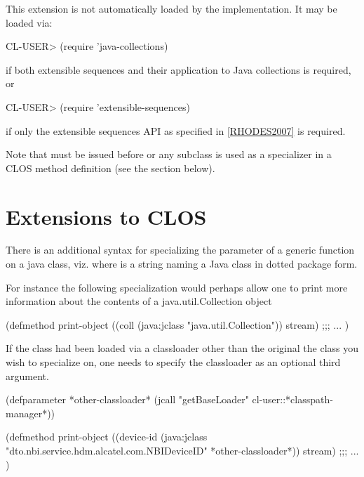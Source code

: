 \documentclass[10pt]{book}
\begin{document}
This extension is not automatically loaded by the implementation.   It
may be loaded via:

\begin{listing-lisp}
CL-USER> (require 'java-collections)
\end{listing-lisp}

if both extensible sequences and their application to Java collections
is required, or

\begin{listing-lisp}
CL-USER> (require 'extensible-sequences)
\end{listing-lisp}

if only the extensible sequences API as specified in \ref{RHODES2007} is
required.

Note that  must be issued before
 or any subclass is used as a specializer in a CLOS
method definition (see the section below).

\section{Extensions to CLOS}

There is an additional syntax for specializing the parameter of a
generic function on a java class, viz. 
where  is a string naming a Java class in dotted package
form.

For instance the following specialization would perhaps allow one to
print more information about the contents of a java.util.Collection
object

\begin{listing-lisp}
(defmethod print-object ((coll (java:jclass "java.util.Collection"))
                         stream)
  ;;; ...
)
\end{listing-lisp}

If the class had been loaded via a classloader other than the original
the class you wish to specialize on, one needs to specify the
classloader as an optional third argument.

\begin{listing-lisp}

(defparameter *other-classloader*
  (jcall "getBaseLoader" cl-user::*classpath-manager*))
  
(defmethod print-object ((device-id (java:jclass "dto.nbi.service.hdm.alcatel.com.NBIDeviceID" *other-classloader*))
                         stream)
  ;;; ...
)
\end{listing-lisp}
\end{document}
